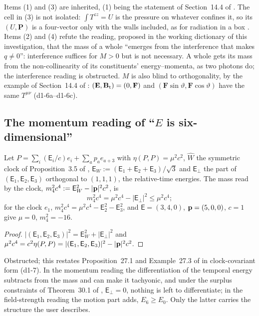 Items (1) and (3) are inherited, (1) being the statement of Section~14.4 of \cite{ES17}. The cell in (3) is not isolated: $\int T^{zz}=U$ is the
pressure on whatever confines it, so its $(U,\mathbf P)$ is a four-vector only with the walls included, as for radiation in a box \cite{Laue1911}.
Items (2) and (4) refute the reading, proposed in the working dictionary of this investigation, that the mass of a whole ``emerges from the
interference that makes $q\neq0$'': interference suffices for $M>0$ but is not necessary. A whole gets its mass from the non-collinearity of its
constituents' energy--momenta, as two photons do; the interference reading is obstructed. $M$ is also blind to orthogonality, by the example of
Section~14.4 of \cite{ES17}: $(\mathbf E,\mathbf B_{\rm t})=(0,\mathbf F)$ and $(\mathbf F\sin\vartheta,\mathbf F\cos\vartheta)$ have the same $T^{\mu\nu}$ (d1-6a--d1-6c).

\subsection{\texorpdfstring{The momentum reading of ``$E$ is six-dimensional''}{The momentum reading of "E is six-dimensional"}}
\label{d1:sec:momentum}

\begin{proposition}
\label{d1:prop:momentum}
Let $P=\sum_i(\mathsf E_i/c)e_i+\sum_ap_ae_{a+3}$ with $\eta(P,P)=\mu^2c^2$, $\widehat W$ the symmetric clock of Proposition~3.5 of \cite{ES17},
$\mathsf E_W:=(\mathsf E_1+\mathsf E_2+\mathsf E_3)/\sqrt3$ and $\mathsf E_\perp$ the part of $(\mathsf E_1,\mathsf E_2,\mathsf E_3)$ orthogonal to
$(1,1,1)$, the relative-time energies. The mass read by the clock, $m_4^2c^4:=\mathsf E_W^2-|\mathbf p|^2c^2$, is
\[
m_4^2c^4=\mu^2c^4-|\mathsf E_\perp|^2\le\mu^2c^4 ;
\]
for the clock $e_1$, $m_4^2c^4=\mu^2c^4-\mathsf E_2^2-\mathsf E_3^2$, and $\mathsf E=(3,4,0)$, $\mathbf p=(5,0,0)$, $c=1$ give $\mu=0$, $m_4^2=-16$.
\end{proposition}

\begin{proof}
$|(\mathsf E_1,\mathsf E_2,\mathsf E_3)|^2=\mathsf E_W^2+|\mathsf E_\perp|^2$ and $\mu^2c^4=c^2\eta(P,P)=|(\mathsf E_1,\mathsf E_2,\mathsf E_3)|^2-|\mathbf p|^2c^2$.
\end{proof}

Obstructed; this restates Proposition~27.1 and Example~27.3 of \cite{ES17} in clock-covariant form (d1-7). In the momentum reading the
differentiation of the temporal energy subtracts from the mass and can make it tachyonic, and under the surplus constraints of Theorem~30.1 of
\cite{ES17}, $\mathsf E_\perp=0$, nothing is left to differentiate; in the field-strength reading the motion part adds, $E_6\ge E_0$. Only the latter
carries the structure the user describes.

